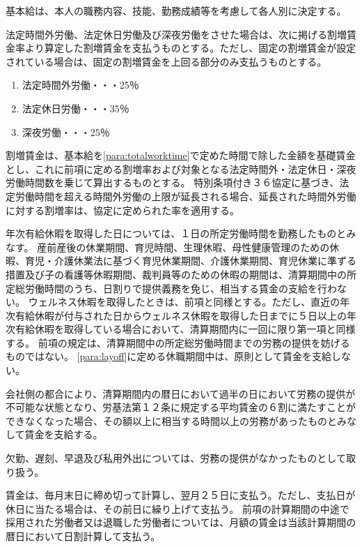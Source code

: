 \documentclass[10pt,a4paper,uplatex]{jsarticle}
\begin{document}
基本給は、本人の職務内容、技能、勤務成績等を考慮して各人別に決定する。

法定時間外労働、法定休日労働及び深夜労働をさせた場合は、次に掲げる割増賃金率より算定した割増賃金を支払うものとする。ただし、固定の割増賃金が設定されている場合は、固定の割増賃金を上回る部分のみ支払うものとする。
\begin{enumerate}
    \item 法定時間外労働・・・25％
    \item 法定休日労働・・・35％
    \item 深夜労働・・・25％
\end{enumerate}
\term 割増賃金は、基本給を\ref{para:totalworktime}で定めた時間で除した金額を基礎賃金とし、これに前項に定める割増率および対象となる法定時間外・法定休日・深夜労働時間数を乗じて算出するものとする。
\term 特別条項付き３６協定に基づき、法定労働時間を超える時間外労働の上限が延長される場合、延長された時間外労働に対する割増率は、協定に定められた率を適用する。

年次有給休暇を取得した日については、１日の所定労働時間を勤務したものとみなす。
\term
産前産後の休業期間、育児時間、生理休暇、母性健康管理のための休暇、育児・介護休業法に基づく育児休業期間、介護休業期間、育児休業に準ずる措置及び子の看護等休暇期間、裁判員等のための休暇の期間は、清算期間中の所定総労働時間のうち、日割りで提供義務を免じ、相当する賃金の支給を行わない。 
\term 
ウェルネス休暇を取得したときは、前項と同様とする。ただし、直近の年次有給休暇が付与された日からウェルネス休暇を取得した日までに５日以上の年次有給休暇を取得している場合において、清算期間内に一回に限り第一項と同様する。
\term
前項の規定は、清算期間中の所定総労働時間までの労務の提供を妨げるものではない。
\term
\ref{para:layoff}に定める休職期間中は、原則として賃金を支給しない。

会社側の都合により、清算期間内の暦日において過半の日において労務の提供が不可能な状態となり、労基法第１２条に規定する平均賃金の６割に満たすことができなくなった場合、その額以上に相当する時間以上の労務があったものとみなして賃金を支給する。

欠勤、遅刻、早退及び私用外出については、労務の提供がなかったものとして取り扱う。

賃金は、毎月末日に締め切って計算し、翌月２５日に支払う。ただし、支払日が休日に当たる場合は、その前日に繰り上げて支払う。
\term
前項の計算期間の中途で採用された労働者又は退職した労働者については、月額の賃金は当該計算期間の暦日において日割計算して支払う。
\end{document}
